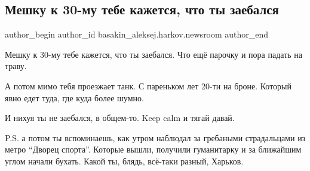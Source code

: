  
 
 
 
 
 
\subsection{Мешку к 30-му тебе кажется, что ты заебался}
\label{sec:14_05_2022.fb.basakin_aleksej.harkov.newsroom.1.meshok}
 
\ifcmt
 author_begin
   author_id basakin_aleksej.harkov.newsroom
 author_end
\fi

Мешку к 30-му тебе кажется, что ты заебался. Что ещё парочку и пора падать на
траву.

А потом мимо тебя проезжает танк. С пареньком лет 20-ти на броне. Который явно
едет туда, где куда более шумно.

И нихуя ты не заебался, в общем-то. Keep calm и тягай давай.


P.S. а потом ты вспоминаешь, как утром наблюдал за гребаными страдальцами из
метро \enquote{Дворец спорта}. Которые вышли, получили гуманитарку и за ближайшим углом
начали бухать. Какой ты, блядь, всё-таки разный, Харьков.
